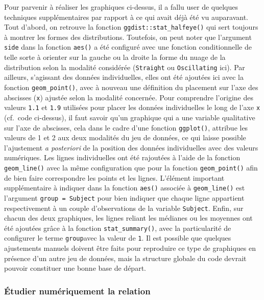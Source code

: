 \documentclass[
  french,
]{book}
\begin{document}
Pour parvenir à réaliser les graphiques ci-dessus, il a fallu user de quelques techniques supplémentaires par rapport à ce qui avait déjà été vu auparavant. Tout d'abord, on retrouve la fonction \texttt{ggdist::stat\_halfeye()} qui sert toujours à montrer les formes des distributions. Toutefois, on peut noter que l'argument \texttt{side} dans la fonction \texttt{aes()} a été configuré avec une fonction conditionnelle de telle sorte à orienter sur la gauche ou la droite la forme du nuage de la distribution selon la modalité considérée (\texttt{Straight} ou \texttt{Oscillating} ici). Par ailleurs, s'agissant des données individuelles, elles ont été ajoutées ici avec la fonction \texttt{geom\_point()}, avec à nouveau une définition du placement sur l'axe des abscisses (\texttt{x}) ajustée selon la modalité concernée. Pour comprendre l'origine des valeurs \texttt{1.1} et \texttt{1.9} utilisées pour placer les données individuelles le long de l'axe \texttt{x} (cf.~code ci-dessus), il faut savoir qu'un graphique qui a une variable qualitative sur l'axe de abscisses, cela dans le cadre d'une fonction \texttt{ggplot()}, attribue les valeurs de 1 et 2 aux deux modalités du jeu de données, ce qui laisse possible l'ajustement \emph{a posteriori} de la position des données individuelles avec des valeurs numériques. Les lignes individuelles ont été rajoutées à l'aide de la fonction \texttt{geom\_line()} avec la même configuration que pour la fonction \texttt{geom\_point()} afin de bien faire correspondre les points et les lignes. L'élément important supplémentaire à indiquer dans la fonction \texttt{aes()} associée à \texttt{geom\_line()} est l'argument \texttt{group\ =\ Subject} pour bien indiquer que chaque ligne appartient respectivement à un couple d'observations de la variable \texttt{Subject}. Enfin, sur chacun des deux graphiques, les lignes reliant les médianes ou les moyennes ont été ajoutées grâce à la fonction \texttt{stat\_summary()}, avec la particularité de configurer le terme \texttt{group}avec la valeur de \texttt{1}. Il est possible que quelques ajustements manuels doivent être faits pour reproduire ce type de graphiques en présence d'un autre jeu de données, mais la structure globale du code devrait pouvoir constituer une bonne base de départ.

\hypertarget{uxe9tudier-numuxe9riquement-la-relation-2}{%
\subsubsection{Étudier numériquement la relation}\label{uxe9tudier-numuxe9riquement-la-relation-2}}
\end{document}

